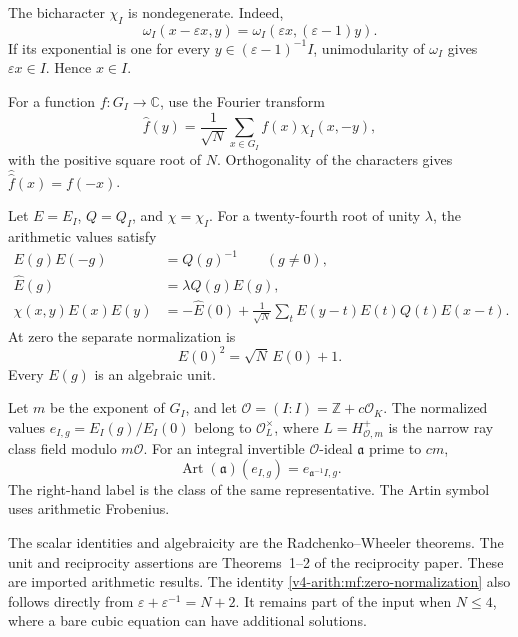 The bicharacter \(\chi_I\) is nondegenerate.
Indeed,
\[
 \omega_I(x-\varepsilon x,y)
       =\omega_I(\varepsilon x,(\varepsilon-1)y).
\]
If its exponential is one for every
\(y\in(\varepsilon-1)^{-1}I\), unimodularity of \(\omega_I\)
gives \(\varepsilon x\in I\). Hence \(x\in I\).

For a function \(f:G_I\to\mathbb C\), use the Fourier transform
\[
 \widehat f(y)=\frac1{\sqrt N}
        \sum_{x\in G_I}f(x)\chi_I(x,-y),
\]
with the positive square root of \(N\).
Orthogonality of the characters gives
\(\widehat{\widehat f}(x)=f(-x)\).

\begin{theorem}\label{v4-arith:mf:arithmetic-input}
Let \(E=E_I\), \(Q=Q_I\), and \(\chi=\chi_I\).
For a twenty-fourth root of unity \(\lambda\), the arithmetic
values satisfy
\begin{align}
 E(g)E(-g)&=Q(g)^{-1}\qquad(g\ne0),\label{v4-arith:mf:reflection}\\
 \widehat E(g)&=\lambda Q(g)E(g),\label{v4-arith:mf:fourier}\\
 \chi(x,y)E(x)E(y)
 &=-\widehat E(0)+\frac1{\sqrt N}
      \sum_t E(y-t)E(t)Q(t)E(x-t).
       \label{v4-arith:mf:cubic}
\end{align}
At zero the separate normalization is
\begin{equation}\label{v4-arith:mf:zero-normalization}
 E(0)^2=\sqrt N\,E(0)+1.
\end{equation}
Every \(E(g)\) is an algebraic unit.

Let \(m\) be the exponent of \(G_I\), and let
\(\mathcal O=(I:I)=\mathbb Z+c\mathcal O_K\).
The normalized values
\(e_{I,g}=E_I(g)/E_I(0)\) belong to
\(\mathcal O_L^\times\), where \(L=H^+_{\mathcal O,m}\)
is the narrow ray class field modulo \(m\mathcal O\).
For an integral invertible \(\mathcal O\)-ideal \(\mathfrak a\)
prime to \(cm\),
\begin{equation}\label{v4-arith:mf:artin-input}
 \operatorname{Art}(\mathfrak a)(e_{I,g})
       =e_{\mathfrak a^{-1}I,g}.
\end{equation}
The right-hand label is the class of the same representative.
The Artin symbol uses arithmetic Frobenius.
\end{theorem}

The scalar identities and algebraicity are the
Radchenko--Wheeler theorems.
The unit and reciprocity assertions are Theorems~1--2 of the
reciprocity paper. These are imported arithmetic results.
The identity \eqref{v4-arith:mf:zero-normalization} also follows
directly from
\(\varepsilon+\varepsilon^{-1}=N+2\).
It remains part of the input when \(N\le4\), where a bare cubic
equation can have additional solutions.

